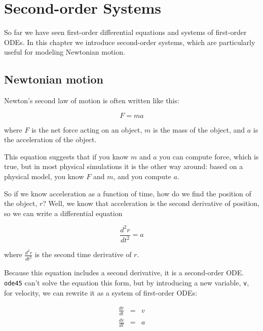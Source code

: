 \documentclass[
]{book}
\numberwithin{Answer}{chapter}
\numberwithin{Exercise}{chapter}
\begin{document}
\chapter{Second-order Systems}

So far we have seen first-order differential equations and systems of first-order ODEs.  In this chapter we introduce second-order systems, which are particularly useful for modeling Newtonian motion.


\section{Newtonian motion}

Newton's second law of motion is often written like this:

\begin{equation}
    F = m a
\end{equation}

where $F$ is the net force acting on an object, $m$ is the
mass of the object, and $a$ is the acceleration of the object.

This equation suggests
that if you know $m$ and $a$ you can compute force, which is true,
but in most physical simulations it is the other way around:  based on a
physical model, you know $F$ and $m$, and you compute $a$.


So if we know acceleration as a function of time, how do we
find the position of the object, $r$?  Well, we know that acceleration
is the second derivative of position, so we can write a differential
equation

\begin{equation}
\label{eq:pos_acc}
    \frac{d^2r}{dt^2} = a
\end{equation}

where $\frac{d^2r}{dt^2}$ is the second time derivative of $r$.

Because this equation includes a second derivative, it is
a second-order ODE.  {\tt ode45} can't solve the equation this form, but
by introducing a new variable, {\tt v}, for velocity, we can rewrite it
as a system of first-order ODEs:

\begin{eqnarray}
    \label{eq:pos_vel}
    \frac{dr}{dt} &=& v   \\
    \label{eq:vel_acc}
    \frac{dv}{dt} &=& a   \\
\end{eqnarray}
\end{document}
